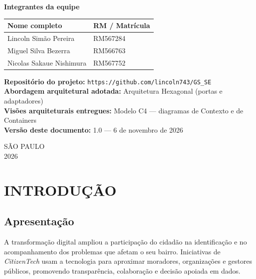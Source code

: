 \documentclass[12pt,a4paper,oneside]{article}
\newcommand{\cab}[1]{\textbf{\footnotesize #1}}
\begin{document}
\vspace{1.0cm}
\begin{center}
\begin{minipage}{0.90\textwidth}
\singlespacing\small
\textbf{Integrantes da equipe}\\[6pt]
\begin{tabularx}{\textwidth}{X L{3.2cm}}
\toprule
\cab{Nome completo} & \cab{RM / Matrícula} \\
\midrule
Lincoln Simão Pereira & RM567284 \\
Miguel Silva Bezerra & RM566763 \\
Nicolas Sakaue Nishimura & RM567752 \\
\bottomrule
\end{tabularx}

\vspace{14pt}
\textbf{Repositório do projeto:}
\texttt{https://github.com/lincoln743/GS\_SE}\\[4pt]
\textbf{Abordagem arquitetural adotada:} Arquitetura Hexagonal
(portas e adaptadores)\\[2pt]
\textbf{Visões arquiteturais entregues:} Modelo C4 — diagramas de Contexto e de
Containers\\[2pt]
\textbf{Versão deste documento:} 1.0 — 6 de novembro de 2026
\end{minipage}
\end{center}

\vfill
\begin{center}
{\normalsize SÃO PAULO\\2026\par}
\end{center}
\newpage

\thispagestyle{empty}
\tableofcontents
\newpage
\setcounter{page}{4}

\section{INTRODUÇÃO}

\subsection{Apresentação}

A transformação digital ampliou a participação do cidadão na identificação e no
acompanhamento dos problemas que afetam o seu bairro. Iniciativas de
\emph{CitizenTech} usam a tecnologia para aproximar moradores, organizações e
gestores públicos, promovendo transparência, colaboração e decisão apoiada em
dados.
\end{document}
